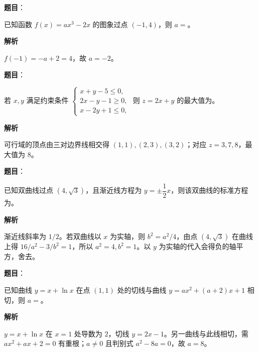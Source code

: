 \begin{answer}

\textbf{题目}：

已知函数 $f(x)=ax^3-2x$ 的图象过点 $(-1,4)$，则 $a=$\gkblank{}。

\textbf{解析}

$f(-1)=-a+2=4$，故 $a=-2$。


\end{answer}
\begin{answer}

\textbf{题目}：

若 $x,y$ 满足约束条件 $\begin{cases}x+y-5\le0,\\2x-y-1\ge0,\\x-2y+1\le0,\end{cases}$ 则 $z=2x+y$ 的最大值为\gkblank{}。

\textbf{解析}

可行域的顶点由三对边界线相交得 $(1,1),(2,3),(3,2)$；对应 $z=3,7,8$，最大值为 $8$。


\end{answer}
\begin{answer}

\textbf{题目}：

已知双曲线过点 $(4,\sqrt3)$，且渐近线方程为 $y=\pm\dfrac12x$，则该双曲线的标准方程为\gkblank{}。

\textbf{解析}

渐近线斜率为 $1/2$。若双曲线以 $x$ 为实轴，则 $b^2=a^2/4$，由点 $(4,\sqrt3)$ 在曲线上得 $16/a^2-3/b^2=1$，所以 $a^2=4,b^2=1$。以 $y$ 为实轴的代入会得负的轴平方，舍去。


\end{answer}
\begin{answer}

\textbf{题目}：

已知曲线 $y=x+\ln x$ 在点 $(1,1)$ 处的切线与曲线 $y=ax^2+(a+2)x+1$ 相切，则 $a=$\gkblank{}。

\textbf{解析}

$y=x+\ln x$ 在 $x=1$ 处导数为 $2$，切线 $y=2x-1$。另一曲线与此线相切，需 $ax^2+ax+2=0$ 有重根；$a\ne0$ 且判别式 $a^2-8a=0$，故 $a=8$。


\end{answer}
